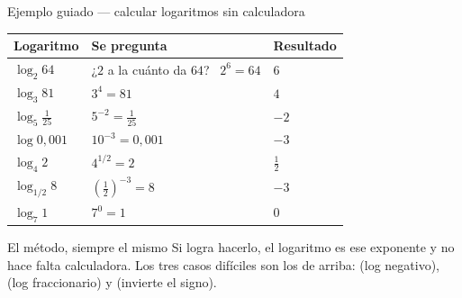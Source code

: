 \documentclass[aspectratio=169,10pt]{beamer}
\begin{document}
\begin{frame}{Ejemplo guiado — calcular logaritmos sin calculadora}
  \scriptsize
  \begin{center}
  \begin{tabular}{@{}lp{4.6cm}l@{}}
    \toprule
    \textbf{Logaritmo} & \textbf{Se pregunta} & \textbf{Resultado} \\
    \midrule
    $\log_{2}64$ & ¿$2$ a la cuánto da $64$? \ $2^{6}=64$ & $6$ \\
    $\log_{3}81$ & $3^{4}=81$ & $4$ \\
    $\log_{5}\tfrac{1}{25}$ & $5^{-2}=\tfrac{1}{25}$ & $-2$ \\
    $\log 0{,}001$ & $10^{-3}=0{,}001$ & $-3$ \\
    $\log_{4}2$ & $4^{1/2}=2$ & $\tfrac{1}{2}$ \\
    $\log_{1/2}8$ & $\left(\tfrac{1}{2}\right)^{-3}=8$ & $-3$ \\
    $\log_{7}1$ & $7^{0}=1$ & $0$ \\
    \bottomrule
  \end{tabular}
  \end{center}

  \vspace{0.08cm}
  \begin{alertblock}{El método, siempre el mismo}
    \tiny
     Si logra hacerlo,
    el logaritmo es ese exponente y no hace falta calculadora. Los tres casos
    difíciles son los de arriba:  (log negativo),
     (log fraccionario) y  (invierte el signo).
  \end{alertblock}
\end{frame}
\end{document}
